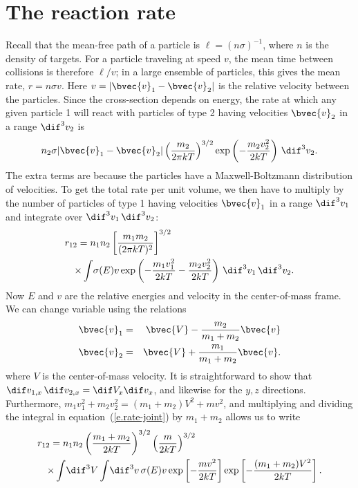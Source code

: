 \section{The reaction rate}
Recall that the mean-free path of a particle is $\ell = (n\sigma)^{-1}$, where $n$ is the density of targets.  For a particle traveling at speed $v$, the mean time between collisions is therefore $\ell/v$; in a large ensemble of particles, this gives the mean rate, $r = n\sigma v$.  Here $v = |\bvec{v}_{1}-\bvec{v}_{2}|$ is the relative velocity between the particles.  Since the cross-section depends on energy, the rate at which any given particle 1 will react with particles of type 2 having velocities $\bvec{v}_{2}$ in a range $\dif^{3}v_{2}$ is
\[ n_{2} \sigma |\bvec{v}_{1}-\bvec{v}_{2}| \left(\frac{m_{2}}{2\pi kT}\right)^{3/2}\exp\left(-\frac{m_{2}v_{2}^{2}}{2kT}\right) \,\dif^{3}v_{2}. \]
The extra terms are because the particles have a Maxwell-Boltzmann distribution of velocities.  To get the total rate per unit volume, we then have to multiply by the number of particles of type 1 having velocities $\bvec{v}_{1}$ in a range $\dif^{3} v_{1}$ and integrate over $\dif^{3}v_{1}\,\dif^{3}v_{2}$:
\begin{eqnarray}\label{e.rate-joint}
\lefteqn{r_{12} = n_{1}n_{2}  \left[\frac{m_{1}m_{2}}{(2\pi kT)^{2}}\right]^{3/2}}
  \nonumber\\ &&\times\int\! \sigma(E) v\exp\left(-\frac{m_{1}v_{1}^{2}}{2kT}-\frac{m_{2}v_{2}^{2}}{2kT}\right)  \,\dif^{3} v_{1}\,\dif^{3}v_{2}.
\end{eqnarray}
Now $E$ and $v$ are the relative energies and velocity in the center-of-mass frame.  We can change variable using the relations
\begin{eqnarray*}
\bvec{v}_{1} &=& \bvec{V} - \frac{m_{2}}{m_{1}+m_{2}} \bvec{v}\\
\bvec{v}_{2} &=& \bvec{V} + \frac{m_{1}}{m_{1}+m_{2}} \bvec{v}.
\end{eqnarray*}
where $V$ is the center-of-mass velocity. It is straightforward to show that $\dif v_{1,x}\,\dif v_{2,x} = \dif V_{x}\dif v_{x}$, and likewise for the $y,z$ directions.  Furthermore, $m_{1}v_{1}^{2} + m_{2}v_{2}^{2} = (m_{1}+m_{2})V^{2} + m v^{2}$, and multiplying and dividing the integral in equation~(\ref{e.rate-joint}) by $m_{1}+m_{2}$ allows us to write
\begin{eqnarray*}
\lefteqn{r_{12} = n_{1}n_{2} \left(\frac{m_{1}+m_{2}}{2kT}\right)^{3/2}\left(\frac{m}{2kT}\right)^{3/2}}\\
&&\times \int\!\dif^{3}V \int\!\dif^{3}v \,\sigma(E)v \exp\left[-\frac{mv^{2}}{2kT}\right]
 \exp\left[-\frac{(m_{1}+m_{2})V^{2}}{2kT}\right].
\end{eqnarray*}

